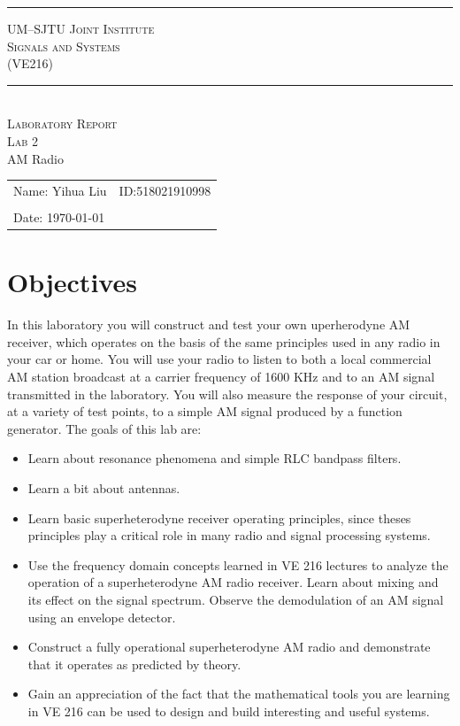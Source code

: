 \documentclass[a4paper]{article}
\begin{document}
\begin{titlepage}
	\begin{Large}
		\begin{center}
			\noindent\rule[0.25\baselineskip]{\textwidth}{1pt}
			\vspace{0.5cm}
			\textsc{UM--SJTU Joint Institute}\\
			\vspace{0.25cm}
			\textsc{Signals and Systems\\(VE216)}
			\noindent\rule[0.25\baselineskip]{\textwidth}{1pt}
			\vspace{4.9cm}\\
			\textsc{Laboratory Report}\\
			\vspace{0.85cm}
			\textsc{Lab 2}\\
			\vspace{0.5em}
			AM Radio
			\vspace{6cm}
		\end{center}
	\end{Large}
	\begin{tabular}{ll}
		Name: Yihua Liu&ID:518021910998\\
		&\\
		Date: \today&\\
	\end{tabular}
\end{titlepage}
\newpage
\renewcommand\thesection{\arabic{section}}
\section{Objectives}
In this laboratory you will construct and test your own uperherodyne AM receiver, which operates on the basis of the same principles used in any radio in your car or home. You will use your radio to listen to both a local commercial AM station broadcast at a carrier frequency of 1600 KHz and to an AM signal transmitted in the laboratory. You will also measure the response of your circuit, at a variety of test points, to a simple AM signal produced by a function generator. The goals of this lab are:
\begin{itemize}
	\item Learn about resonance phenomena and simple RLC bandpass filters.
	\item Learn a bit about antennas.
	\item Learn basic superheterodyne receiver operating principles, since theses principles play a critical role in many radio and signal processing systems.
	\item Use the frequency domain concepts learned in VE 216 lectures to analyze the operation of a superheterodyne AM radio receiver. Learn about mixing and its effect on the signal spectrum. Observe the demodulation of an AM signal using an envelope detector.
	\item Construct a fully operational superheterodyne AM radio and demonstrate that it operates as predicted by theory.
	\item Gain an appreciation of the fact that the mathematical tools you are learning in VE 216 can be used to design and build interesting and useful systems.
\end{itemize}
\end{document}
